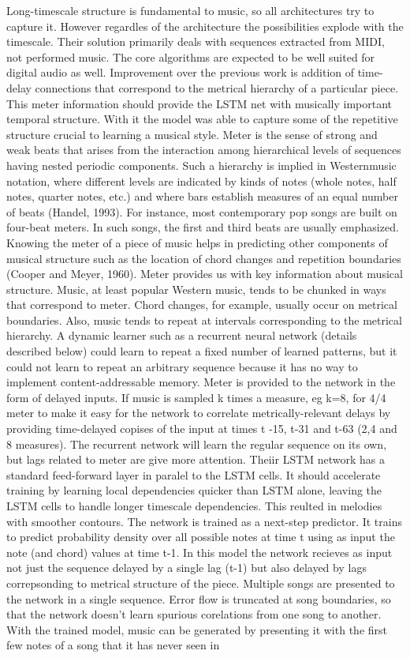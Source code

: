 \cite{Eck2008} Long-timescale structure is fundamental to music, so all architectures try to capture it. However regardles of the architecture the possibilities explode with the timescale. Their solution primarily deals with sequences extracted from MIDI, not performed music. The core algorithms are expected to be well suited for digital audio as well. Improvement over the previous work is addition of time-delay connections that correspond to the metrical hierarchy of a particular piece. This meter information should provide the LSTM net with musically important temporal structure. With it the model was able to capture some of the repetitive structure crucial to learning a musical style. Meter is the sense of strong and weak beats that arises from the interaction among hierarchical levels of sequences having nested periodic components. Such a hierarchy is implied in Westernmusic notation, where different levels are indicated by kinds of notes (whole notes, half notes, quarter notes, etc.) and where bars establish measures of an equal number of beats (Handel, 1993). For instance, most contemporary pop songs are built on four-beat meters. In such songs, the first and third beats are usually emphasized. Knowing the meter of a piece of music helps in predicting other components of musical structure such as the location of chord changes and repetition boundaries (Cooper and Meyer, 1960). Meter provides us with key information about musical structure. Music, at least popular Western music, tends to be chunked in ways that correspond to meter. Chord changes, for example, usually occur on metrical boundaries. Also, music tends to repeat at intervals corresponding to the metrical hierarchy. A dynamic learner such as a recurrent neural network (details described below) could learn to repeat a fixed number of learned patterns, but it could not learn to repeat an arbitrary sequence because it has no way to implement content-addressable memory. Meter is provided to the network in the form of delayed inputs. If music is sampled k times a measure, eg k=8, for 4/4 meter to make it easy for the network to correlate metrically-relevant delays by providing time-delayed copises of the input at times t -15, t-31 and t-63 (2,4 and 8 measures). The recurrent network will learn the regular sequence on its own, but lags related to meter are give more attention. Theiir LSTM network has a standard feed-forward layer in paralel to the LSTM cells. It should accelerate training by learning local dependencies quicker than LSTM alone, leaving the LSTM cells to handle longer timescale dependencies. This reulted in melodies with smoother contours. The network is trained as a next-step predictor. It trains to predict probability density over all possible notes at time t using as input the note (and chord) values at time t-1. In this model the network recieves as input not just the sequence delayed by a single lag (t-1) but also delayed by lags correpsonding to metrical structure of the piece. Multiple songs are presented to the network in a single sequence. Error flow is truncated at song boundaries, so that the network doesn't learn spurious corelations from one song to another. With the trained model, music can be generated by presenting it with the first few notes of a song that it has never seen in 